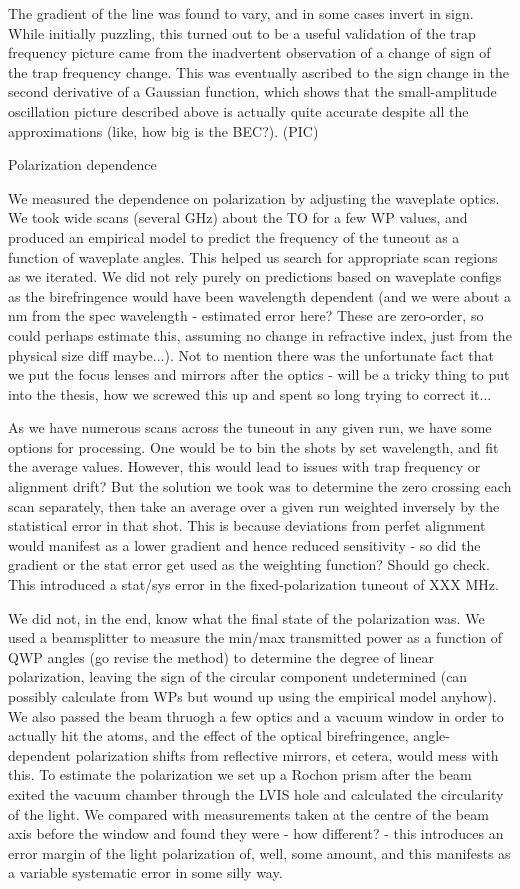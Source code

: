 The gradient of the line was found to vary, and in some cases invert in sign. While initially puzzling, this turned out to be a useful validation of the trap frequency picture came from the inadvertent observation of a change of sign of the trap frequency change. This was eventually ascribed to the sign change in the second derivative of a Gaussian function, which shows that the small-amplitude oscillation picture described above is actually quite accurate despite all the approximations (like, how big is the BEC?). (PIC)


Polarization dependence


We measured the dependence on polarization by adjusting the waveplate optics. We took wide scans (several GHz) about the TO for a few WP values, and produced an empirical model to predict the frequency of the tuneout as a function of waveplate angles. This helped us search for appropriate scan regions as we iterated. We did not rely purely on predictions based on waveplate configs as the birefringence would have been wavelength dependent (and we were about a nm from the spec wavelength - estimated error here? These are zero-order, so could perhaps estimate this, assuming no change in refractive index, just from the physical size diff maybe...). Not to mention there was the unfortunate fact that we put the focus lenses and mirrors after the optics - will be a tricky thing to put into the thesis, how we screwed this up and spent so long trying to correct it... 

As we have numerous scans across the tuneout in any given run, we have some options for processing. One would be to bin the shots by set wavelength, and fit the average values. However, this would lead to issues with trap frequency or alignment drift? But the solution we took was to determine the zero crossing each scan separately, then take an average over a given run weighted inversely by the statistical error in that shot. This is because deviations from perfet alignment would manifest as a lower gradient and hence reduced sensitivity - so did the gradient or the stat error get used as the weighting function? Should go check. This introduced a stat/sys error in the fixed-polarization tuneout of XXX MHz.

We did not, in the end, know what the final state of the polarization was. We used a beamsplitter to measure the min/max transmitted power as a function of QWP angles (go revise the method) to determine the degree of linear polarization, leaving the sign of the circular component undetermined (can possibly calculate from WPs but wound up using the empirical model anyhow). We also passed the beam thruogh a few optics and a vacuum window in order to actually hit the atoms, and the effect of the optical birefringence, angle-dependent polarization shifts from reflective mirrors, et cetera, would mess with this. To estimate the polarization we set up a Rochon prism after the beam exited the vacuum chamber through the LVIS hole and calculated the circularity of the light. We compared with measurements taken at the centre of the beam axis before the window and found they were - how different? - this introduces an error margin of the light polarization of, well, some amount, and this manifests as a variable systematic error in some silly way.


